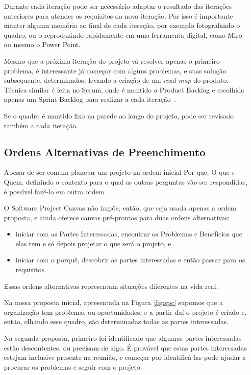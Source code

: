 \documentclass[fontsize=12pt, a4paper,pagesize=auto,toc=listof, ,twoside,chapterprefix=false,appendixprefix=true,open=right]{scrbook}
\begin{document}
Durante cada iteração pode ser necessário adaptar o resultado das iterações anteriores para atender os requisitos da nova iteração. Por isso é importante manter alguma memória ao final de cada iteração, por exemplo fotografando o quadro, ou o reproduzindo rapidamente em uma ferramenta digital, como Miro ou mesmo o Power Point.

Mesmo que a próxima iteração do projeto vá resolver apenas o primeiro problema, é interessante já começar com alguns problemas, e suas solução subsequente, determinados, levando a criação de um \textit{road-map} do produto. Técnica similar é feita no Scrum, onde é mantido o Product Backlog e escolhido apenas um Sprint Backlog para realizar a cada iteração~\citep{scrum:sbok:guide}.

Se o quadro é mantido fixo na parede ao longo do projeto, pode ser revisado também a cada iteração.

\subsection{Ordens Alternativas de Preenchimento}

Apesar de ser comum planejar um projeto na ordem inicial Por que, O que e Quem, definindo o contexto para o qual as outras perguntas vão ser respondidas, é possível fazê-lo em outra ordem.

O Software Project Canvas não impõe, então, que seja usada apenas a ordem proposta, e ainda oferece canvas pré-prontos para duas ordens alternativas:
\begin{itemize}
    \item iniciar com as Partes Interessadas, encontrar os Problemas e Benefícios que elas tem e só depois projetar o que será o projeto, e
    \item iniciar com o porquê, descobrir as partes interessadas e então passar para os requisitos.
\end{itemize}

Essas ordens alternativas representam situações diferentes na vida real.

Na nossa proposta inicial, apresentada na Figura \ref{fig:spc} supomos que a organização tem problemas ou oportunidades, e a partir daí o projeto é criado e, então, olhando esse quadro, são determinadas todas as partes interessadas.

Na segunda proposta, primeiro foi identificado que algumas partes interessadas estão descontentes, ou precisam de algo. É provável que estas partes interessadas estejam inclusive presente na reunião, e começar por identificá-las pode ajudar a procurar os problemas e seguir com o projeto.
\end{document}
